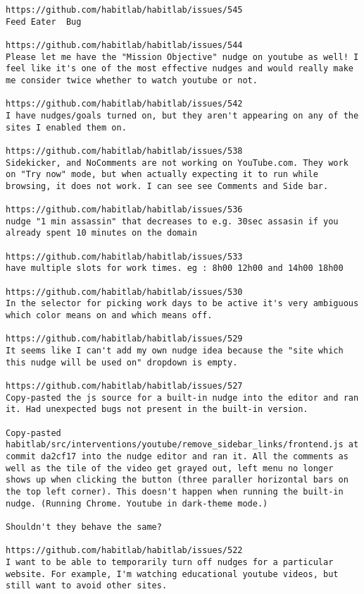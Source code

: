 \begin{lstlisting}[breaklines]
https://github.com/habitlab/habitlab/issues/545
Feed Eater  Bug

https://github.com/habitlab/habitlab/issues/544
Please let me have the "Mission Objective" nudge on youtube as well! I feel like it's one of the most effective nudges and would really make me consider twice whether to watch youtube or not.

https://github.com/habitlab/habitlab/issues/542
I have nudges/goals turned on, but they aren't appearing on any of the sites I enabled them on.

https://github.com/habitlab/habitlab/issues/538
Sidekicker, and NoComments are not working on YouTube.com. They work on "Try now" mode, but when actually expecting it to run while browsing, it does not work. I can see see Comments and Side bar.

https://github.com/habitlab/habitlab/issues/536
nudge "1 min assassin" that decreases to e.g. 30sec assasin if you already spent 10 minutes on the domain

https://github.com/habitlab/habitlab/issues/533
have multiple slots for work times. eg : 8h00 12h00 and 14h00 18h00

https://github.com/habitlab/habitlab/issues/530
In the selector for picking work days to be active it's very ambiguous which color means on and which means off.

https://github.com/habitlab/habitlab/issues/529
It seems like I can't add my own nudge idea because the "site which this nudge will be used on" dropdown is empty.

https://github.com/habitlab/habitlab/issues/527
Copy-pasted the js source for a built-in nudge into the editor and ran it. Had unexpected bugs not present in the built-in version.

Copy-pasted habitlab/src/interventions/youtube/remove_sidebar_links/frontend.js at commit da2cf17 into the nudge editor and ran it. All the comments as well as the tile of the video get grayed out, left menu no longer shows up when clicking the button (three paraller horizontal bars on the top left corner). This doesn't happen when running the built-in nudge. (Running Chrome. Youtube in dark-theme mode.)

Shouldn't they behave the same?

https://github.com/habitlab/habitlab/issues/522
I want to be able to temporarily turn off nudges for a particular website. For example, I'm watching educational youtube videos, but still want to avoid other sites.


\end{lstlisting}
